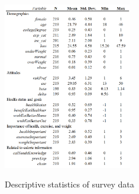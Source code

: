 

\begin{figure}[ht]
  \caption{Descriptive statistics of survey data}\label{table:background}
  \begin{center}
  {\includegraphics[width=0.5\textwidth]{./figures/TEMP_background.png}}
  \end{center}
\end{figure}
